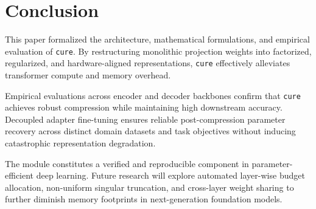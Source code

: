 \section{Conclusion}
This paper formalized the architecture, mathematical formulations, and empirical evaluation of \texttt{cure}. By restructuring monolithic projection weights into factorized, regularized, and hardware-aligned representations, \texttt{cure} effectively alleviates transformer compute and memory overhead.

Empirical evaluations across encoder and decoder backbones confirm that \texttt{cure} achieves robust compression while maintaining high downstream accuracy. Decoupled adapter fine-tuning ensures reliable post-compression parameter recovery across distinct domain datasets and task objectives without inducing catastrophic representation degradation.

The module constitutes a verified and reproducible component in parameter-efficient deep learning. Future research will explore automated layer-wise budget allocation, non-uniform singular truncation, and cross-layer weight sharing to further diminish memory footprints in next-generation foundation models.
